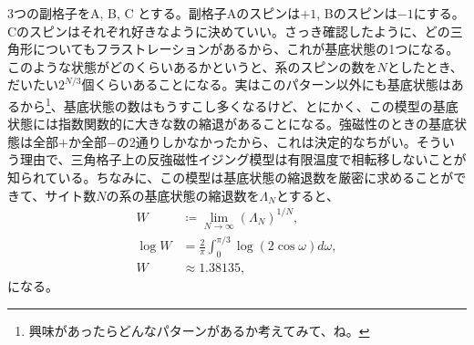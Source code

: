 \documentclass[paper=b5j,fontsize=12Q,jafontsize=12Q,baselineskip=21Q]{jlreq}
\begin{document}
\begin{refsection}

3つの副格子をA, B, C とする。副格子Aのスピンは$+1$, Bのスピンは$-1$にする。Cのスピンはそれぞれ好きなように決めていい。さっき確認したように、どの三角形についてもフラストレーションがあるから、これが基底状態の1つになる。このような状態がどのくらいあるかというと、系のスピンの数を$N$としたとき、だいたい$2^{N/3}$個くらいあることになる。実はこのパターン以外にも基底状態はあるから\footnote{興味があったらどんなパターンがあるか考えてみて、ね。}、基底状態の数はもうすこし多くなるけど、とにかく、この模型の基底状態には指数関数的に大きな数の縮退があることになる。強磁性のときの基底状態は全部$+$か全部$-$の2通りしかなかったから、これは決定的なちがい。そういう理由で、三角格子上の反強磁性イジング模型は有限温度で相転移しないことが知られている。ちなみに、この模型は基底状態の縮退数を厳密に求めることができて、サイト数$N$の系の基底状態の縮退数を$\Lambda_N$とすると、
\begin{align}
  W&\coloneqq\lim_{N\to\infty}(\Lambda_N)^{1/N},\\
  \log W &= \frac{2}{\pi} \int_0^{\pi/3} \log(2 \cos \omega) d\omega,\\
  W &\approx 1.38135,
\end{align}
になる。


\end{refsection}
\end{document}

